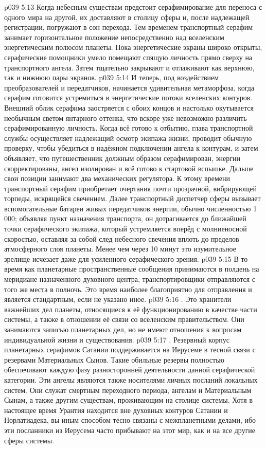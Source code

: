 \vs p039 5:13 \pc Когда небесным существам предстоит серафимирование для переноса с одного мира на другой, их доставляют в столицу сферы и, после надлежащей регистрации, погружают в сон перехода. Тем временем транспортный серафим занимает горизонтальное положение непосредственно над вселенским энергетическим полюсом планеты. Пока энергетические экраны широко открыты, серафические помощники умело помещают спящую личность прямо сверху на транспортного ангела. Затем тщательно закрывают и отлаживают как верхнюю, так и нижнюю пары экранов.
\vs p039 5:14 И теперь, под воздействием преобразователей и передатчиков, начинается удивительная метаморфоза, когда серафим готовится устремиться в энергетические потоки вселенских контуров. Внешний облик серафима заостряется с обоих концов и настолько окутывается необычным светом янтарного оттенка, что вскоре уже невозможно различить серафимированную личность. Когда всё готово к отбытию, глава транспортной службы осуществляет надлежащий осмотр экипажа жизни, проводит обычную проверку, чтобы убедиться в надёжном подключении ангела к контурам, и затем объявляет, что путешественник должным образом серафимирован, энергии скорректированы, ангел изолирован и всё готово к стартовой вспышке. Дальше свои позиции занимают два механических регулятора. К этому времени транспортный серафим приобретает очертания почти прозрачной, вибрирующей торпеды, искрящейся свечением. Далее транспортный диспетчер сферы вызывает вспомогательные батареи живых передатчиков энергии, обычно численностью 1\,000; объявляя пункт назначения транспорта, он дотрагивается до ближайшей точки серафического экипажа, который устремляется вперёд с молниеносной скоростью, оставляя за собой след небесного свечения вплоть до пределов атмосферного слоя планеты. Менее чем через 10 минут это изумительное зрелище исчезает даже для усиленного серафического зрения.
\vs p039 5:15 \pc В то время как планетарные пространственные сообщения принимаются в полдень на меридиане назначенного духовного центра, транспортировщики отправляются с того же места в полночь. Это время наиболее благоприятно для отправления и является стандартным, если не указано иное.
\vs p039 5:16 . Это хранители важнейших дел планеты, относящиеся к её функционированию в качестве части системы, а также в отношении её связи со вселенским правительством. Они занимаются записью планетарных дел, но не имеют отношения к вопросам индивидуальной жизни и существования.
\vs p039 5:17 . Резервный корпус планетарных серафимов Сатании поддерживается на Иерусеме в тесной связи с резервами Материальных Сынов. Такие обильные резервы полностью обеспечивают каждую фазу разносторонней деятельности данной серафической категории. Эти ангелы являются также носителями личных посланий локальных систем. Они служат смертным переходного периода, ангелам и Материальным Сынам, а также другим существам, проживающим на столице системы. Хотя в настоящее время Урантия находится вне духовных контуров Сатании и Норлатиадека, вы иным способом тесно связаны с межпланетными делами, ибо эти посланники из Иерусема часто прибывают на этот мир, как и на все другие сферы системы.
